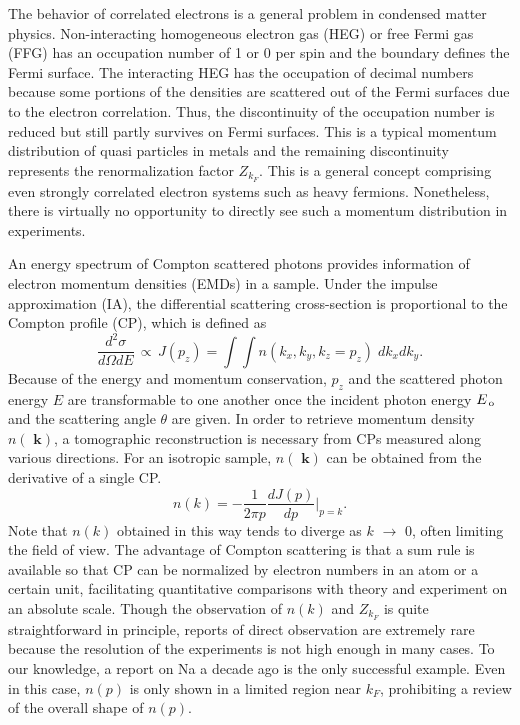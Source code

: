 \documentclass[twocolumn,showpacs,showkeys,fleqn,prl,superscriptaddress]{revtex4}%
\newcommand{\bb}[1]{\textbf{ #1}}
\newcommand{\nn}[1]{\textnormal{ #1}}
\begin{document}
The behavior of correlated electrons is a general problem in condensed matter physics.
Non-interacting homogeneous electron gas (HEG) or free Fermi gas (FFG) has an occupation number of 1 or 0 per spin and the boundary defines the Fermi surface. 
The interacting HEG has the occupation of decimal numbers because some portions of the densities are scattered out of the Fermi surfaces due to the electron correlation. Thus, the discontinuity of the occupation number is reduced but still partly survives on Fermi surfaces. This is a typical momentum distribution of quasi particles in metals and the remaining discontinuity represents the renormalization factor $Z_{k_F}$.
This is a general concept comprising even strongly correlated electron systems such as heavy fermions.         
Nonetheless, there is virtually no opportunity to directly see such a momentum distribution in experiments.

An energy spectrum of Compton scattered photons provides information of electron momentum densities (EMDs) in a sample\cite{sch}.
Under the impulse approximation (IA)\cite{eisen70,kaplan03}, the differential scattering cross-section is proportional to the Compton profile (CP), which is defined as
\begin{equation}
\frac{d^2\sigma}{d\Omega dE} \,\propto \, J(p_z) = \int \!\! \int n(k_x,k_y,k_z\!=\!p_z) \;dk_x dk_y .
\end{equation}
Because of the energy and momentum conservation, $p_z$ and the scattered photon energy $E$ are transformable to one another once the incident photon energy $E_{\nn{\!o}}$ and the scattering angle $\theta$ are given.  
In order to retrieve momentum density $n(\!\!\bb{k})$, a tomographic reconstruction is necessary from CPs measured along various directions.
For an isotropic sample, $n(\!\!\bb{k})$ can be obtained from the derivative of a single CP. 
\begin{equation}
n(k) = - \frac{1}{2 \pi p} \frac{d J(p)}{d p}  | _{p=k}   .
\end{equation}
Note that $n(k)$ obtained in this way tends to diverge as $k$ $\to$ 0, often limiting the field of view.  
The advantage of Compton scattering is that a sum rule is available so that CP can be normalized by electron numbers in an atom or a certain unit, facilitating quantitative comparisons with theory and experiment on an absolute scale.
Though the observation of $n(k)$ and $Z_{k_F}$ is quite straightforward in principle, reports of direct observation are extremely rare because the resolution of the experiments is not high enough in many cases.
To our knowledge, a report on Na a decade ago is the only successful example\cite{simo10}.
Even in this case, $n(p)$ is only shown in a limited region near $k_F$, prohibiting a review of the overall shape of $n(p)$.
\end{document}
